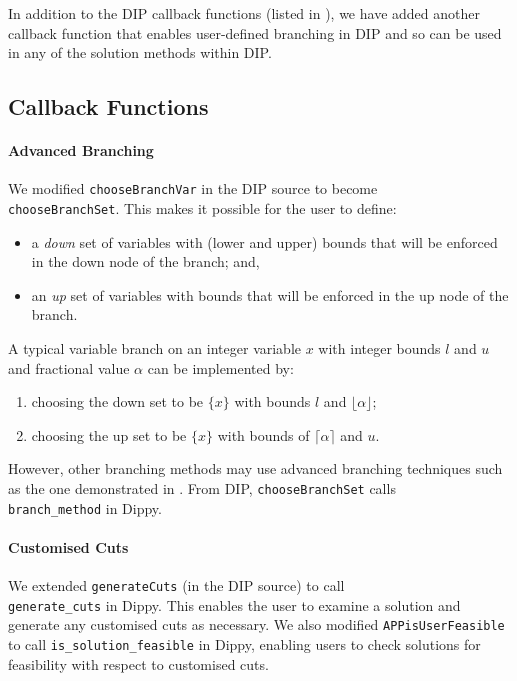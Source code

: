 In addition to the \ac{DIP} callback functions (listed in ), we have added another callback function that enables user-defined branching in \ac{DIP} and so can be used in any of the solution methods within \ac{DIP}.

\subsection{Callback Functions} \label{sbs:callbacks}

\paragraph{Advanced Branching}
We modified \texttt{chooseBranchVar} in the \ac{DIP} source to become \\ \texttt{chooseBranchSet}. This makes it possible for the user to define:
\begin{itemize}
\item a {\it down} set of variables with (lower and upper) bounds that will be enforced in the down node of the branch; and,
\item an {\it up} set of variables with bounds that will be enforced in the up node of the branch.
\end{itemize}
A typical variable branch on an integer variable $x$ with integer bounds $l$ and $u$ and fractional value $\alpha$ can be implemented by:
\begin{enumerate}
\item choosing the down set to be $\{ x \}$ with bounds $l$ and $\lfloor \alpha \rfloor$;
\item choosing the up set to be $\{ x \}$ with bounds of $\lceil \alpha \rceil$ and $u$.
\end{enumerate}
However, other branching methods may use advanced branching techniques such as the one demonstrated in . From \ac{DIP}, {\tt chooseBranchSet} calls \\ {\tt branch\_method} in Dippy.

\paragraph{Customised Cuts} We extended {\tt generateCuts} (in the \ac{DIP} source) to call \\ {\tt generate\_cuts} in Dippy. This enables the user to examine a solution and generate any customised cuts as necessary. We also modified {\tt APPisUserFeasible} to call {\tt is\_solution\_feasible} in Dippy, enabling users to check solutions for feasibility with respect to customised cuts.

